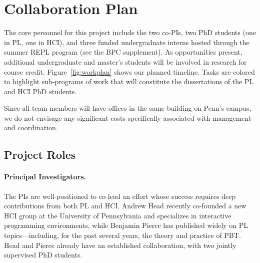 \section*{Collaboration Plan }\label{appendix:coord}


The core personnel for this project include the two co-PIs, two PhD
students (one in PL, one in HCI),
and three funded undergraduate interns hosted through the summer REPL
program (see the BPC supplement). As opportunities present, additional
undergraduate and master's students will be involved in research for
course credit.
Figure~\ref{fig:workplan} shows our planned timeline. Tasks are colored
to highlight sub-programs of work that will constitute the
dissertations of the PL and HCI PhD students.

Since all team members will have offices in the same building on
Penn's campus, we do not envisage any significant costs specifically
associated with management and coordination.

\subsection*{Project Roles}

\paragraph*{Principal Investigators.}
%
The PIs are well-positioned to co-lead an effort whose success
requires deep contributions from both PL and HCI.  Andrew Head
recently co-founded a new HCI group at the University of Pennsylvania
and specializes in interactive programming environments, while
Benjamin Pierce has published widely on PL topics---including, for the
past several years, the theory and practice of PBT.  Head and Pierce
already have an established collaboration, with two jointly supervised
PhD students.

